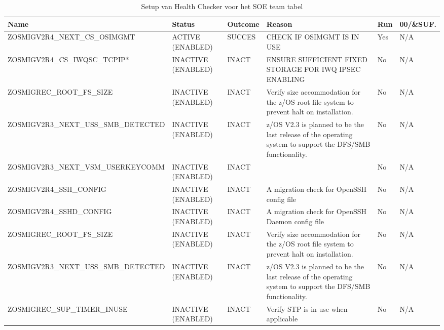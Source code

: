 \begin{landscape}
	\begin{table}[h]
		\begin{tabular}{|l|p{2.3cm}|l|p{4.5cm}|l|l|}
			\hline
			\textbf{Name}                       & \textbf{Status}   & \textbf{Outcome} & \textbf{Reason}    & \textbf{Run} &	\textbf{00/\&SUF.} \\ \hline
			ZOSMIGV2R4\_NEXT\_CS\_OSIMGMT        & ACTIVE (ENABLED)   & SUCCES   & CHECK   IF OSIMGMT IS IN USE                                                                                     & Yes & N/A \\ \hline
			ZOSMIGV2R4\_CS\_IWQSC\_TCPIP*        & INACTIVE (ENABLED) & INACT    & ENSURE   SUFFICIENT FIXED STORAGE FOR   IWQ   IPSEC ENABLING                                                     & No  & N/A \\ \hline
			ZOSMIGREC\_ROOT\_FS\_SIZE            & INACTIVE (ENABLED) & INACT & Verify   size accommodation for the z/OS root file system to prevent halt on   installation.                     & No  & N/A \\ \hline
			ZOSMIGV2R3\_NEXT\_USS\_SMB\_DETECTED & INACTIVE (ENABLED) & INACT & z/OS   V2.3 is planned to be the last release of the operating system to support    the   DFS/SMB functionality. & No  & N/A \\ \hline
			ZOSMIGV2R3\_NEXT\_VSM\_USERKEYCOMM   & INACTIVE (ENABLED) & INACT &                                                                                                                  & No  & N/A \\ \hline
			ZOSMIGV2R4\_SSH\_CONFIG              & INACTIVE (ENABLED) & INACT & A   migration check for OpenSSH config file                                                                      & No  & N/A \\ \hline
			ZOSMIGV2R4\_SSHD\_CONFIG             & INACTIVE (ENABLED) & INACT & A   migration check for OpenSSH Daemon config file                                                               & No  & N/A \\ \hline
			ZOSMIGREC\_ROOT\_FS\_SIZE            & INACTIVE (ENABLED) & INACT & Verify   size accommodation for the z/OS root file system to prevent halt on   installation.                     & No  & N/A \\ \hline
			ZOSMIGV2R3\_NEXT\_USS\_SMB\_DETECTED & INACTIVE (ENABLED) & INACT & z/OS   V2.3 is planned to be the last release of the operating system to support    the   DFS/SMB functionality. & No  & N/A \\ \hline
			ZOSMIGREC\_SUP\_TIMER\_INUSE         & INACTIVE (ENABLED) & INACT & Verify   STP is in use when applicable                                                                           & No  & N/A \\ \hline
		\end{tabular}
		\caption[Health Checker SOE team tabel]{Setup van Health Checker voor het SOE team tabel}
		\label{tbl:SOE Team Tabel}
	\end{table}
\end{landscape}

